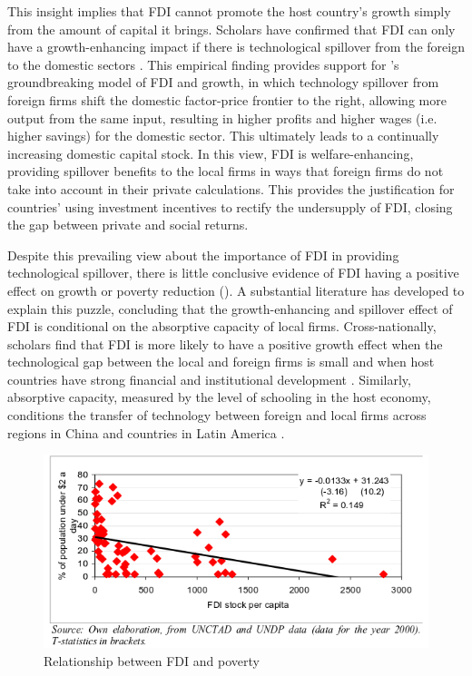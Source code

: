 This insight implies that FDI cannot promote the host country's growth simply from the amount of capital it brings. Scholars have confirmed that FDI can only have a growth-enhancing impact if there is technological spillover from the foreign to the domestic sectors \citep{Nunnenkamp2004}. This empirical finding provides support for \citet{Findlay1978}'s groundbreaking model of FDI and growth, in which technology spillover from foreign firms shift the domestic factor-price frontier to the right, allowing more output from the same input, resulting in higher profits and higher wages (i.e. higher savings) for the domestic sector. This ultimately leads to a continually increasing domestic capital stock. In this view, FDI is welfare-enhancing, providing spillover benefits to the local firms in ways that foreign firms do not take into account in their private calculations. This provides the justification for countries' using investment incentives to rectify the undersupply of FDI, closing the gap between private and social returns. 

Despite this prevailing view about the importance of FDI in providing technological spillover, there is little conclusive evidence of FDI having a positive effect on growth \citep{Nair-Reichert2001, Carkovic2002} or poverty reduction \citep{Guerra2009} (). A substantial literature has developed to explain this puzzle, concluding that the growth-enhancing and spillover effect of FDI is conditional on the absorptive capacity of local firms. Cross-nationally, scholars find that FDI is more likely to have a positive growth effect when the technological gap between the local and foreign firms is small \citep{Nunnenkamp2004} and when host countries have strong financial and institutional development \citep{Durham2004}. Similarly, absorptive capacity, measured by the level of schooling in the host economy, conditions the transfer of technology between foreign and local firms across regions in China \citep{Fu2008} and countries in Latin America \citep{Willem2004}.

\begin{figure}[!ht]
\includegraphics[width=\textwidth, height=\textheight,keepaspectratio]{../figure/fdi_poverty}
\caption{Relationship between FDI and poverty}
\label{fig:fdipoverty}
\end{figure}

